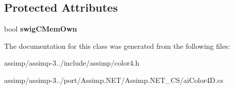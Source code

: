 \subsection*{Protected Attributes}
\begin{DoxyCompactItemize}
\item 
\hypertarget{structai_color4_d_a3592094d8070bd4a2dd407534caf6486}{bool {\bfseries swig\+C\+Mem\+Own}}\label{structai_color4_d_a3592094d8070bd4a2dd407534caf6486}

\end{DoxyCompactItemize}


The documentation for this class was generated from the following files\+:\begin{DoxyCompactItemize}
\item 
assimp/assimp-\/3../include/assimp/color4.\+h\item 
assimp/assimp-\/3../port/\+Assimp.\+N\+E\+T/\+Assimp.\+N\+E\+T\+\_\+\+C\+S/ai\+Color4\+D.\+cs\end{DoxyCompactItemize}
